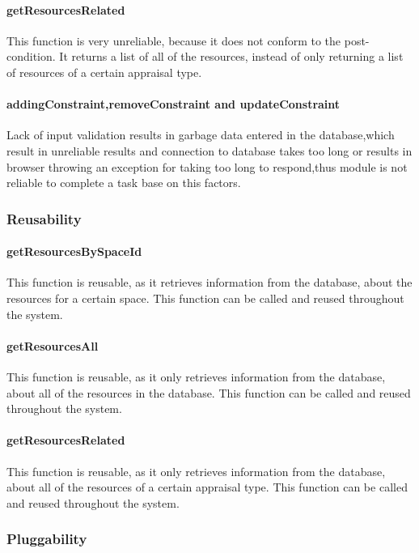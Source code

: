 \documentclass[a4paper]{article}
\begin{document}
\paragraph{getResourcesRelated}
This function is very unreliable, because it does not conform to the post-condition. It returns a list of all of the resources, instead of only returning a list of resources of a certain appraisal type.

\paragraph{addingConstraint,removeConstraint and updateConstraint}
Lack of input validation results in garbage data entered in the database,which result in unreliable results and connection to database takes too long or results in browser throwing an exception for taking too long to respond,thus module is not reliable to complete a task base on this factors.


\subsubsection {Reusability}

\paragraph{getResourcesBySpaceId}
This function is reusable, as it retrieves information from the database, about the resources for a certain space. This function can be called and reused throughout the system.

\paragraph{getResourcesAll}
This function is reusable, as it only retrieves information from the database, about all of the resources in the database. This function can be called and reused throughout the system.

\paragraph{getResourcesRelated}
This function is reusable, as it only retrieves information from the database, about all of the resources of a certain appraisal type. This function can be called and reused throughout the system.

\subsubsection {Pluggability}
\end{document}
